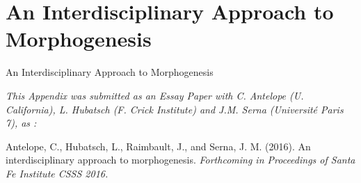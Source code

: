 
\section{An Interdisciplinary Approach to Morphogenesis}{An Interdisciplinary Approach to Morphogenesis} %

\label{app:morphogenesis} %




\textit{This Appendix was submitted as an Essay Paper with C. Antelope (U. California), L. Hubatsch (F. Crick Institute) and J.M. Serna (Université Paris 7), as : }

\noindent Antelope, C., Hubatsch, L., Raimbault, J., and Serna, J. M. (2016). An interdisciplinary approach to morphogenesis. \textit{Forthcoming in Proceedings of Santa Fe Institute CSSS 2016.}







